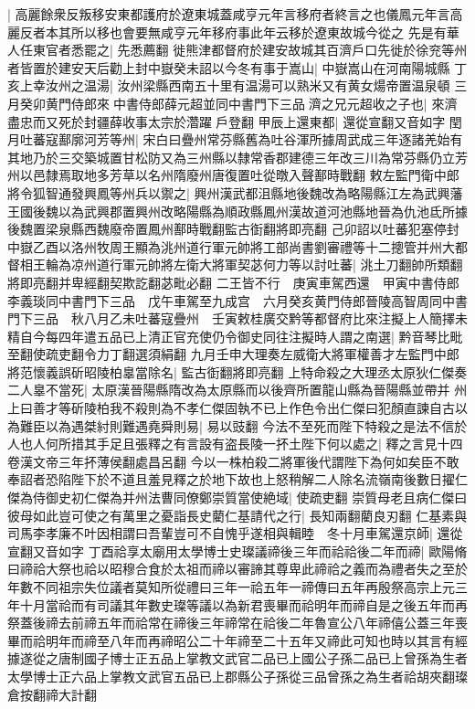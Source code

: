 |{
	高麗餘衆反叛移安東都護府於遼東城蓋咸亨元年言移府者終言之也儀鳳元年言高麗反者本其所以移也會要無咸亨元年移府事此年云移於遼東故城今從之}
先是有華人任東官者悉罷之|{
	先悉薦翻}
徙熊津都督府於建安故城其百濟戶口先徙於徐兖等州者皆置於建安天后勸上封中嶽癸未詔以今冬有事于嵩山|{
	中嶽嵩山在河南陽城縣}
丁亥上幸汝州之温湯|{
	汝州梁縣西南五十里有温湯可以熟米又有黄女煬帝置温泉頓}
三月癸卯黄門侍郎來中書侍郎薛元超並同中書門下三品濟之兄元超收之子也|{
	來濟盡忠而又死於封疆薛收事太宗於濳躍戶登翻}
甲辰上還東都|{
	還從宣翻又音如字}
閏月吐蕃寇鄯廓河芳等州|{
	宋白曰疊州常芬縣舊為吐谷渾所據周武成三年逐諸羌始有其地乃於三交築城置甘松防又為三州縣以隸常香郡建德三年改三川為常芬縣仍立芳州以邑隸焉取地多芳草以名州隋廢州唐復置吐從暾入聲鄯時戰翻}
敕左監門衛中郎將令狐智通發興鳳等州兵以禦之|{
	興州漢武都沮縣地後魏改為略陽縣江左為武興藩王國後魏以為武興郡置興州改略陽縣為順政縣鳳州漢故道河池縣地晉為仇池氐所據後魏置梁泉縣西魏廢帝置鳳州鄯時戰翻監古衘翻將即亮翻}
己卯詔以吐蕃犯塞停封中嶽乙酉以洛州牧周王顯為洮州道行軍元帥將工部尚書劉審禮等十二摠管并州大都督相王輪為凉州道行軍元帥將左衛大將軍契苾何力等以討吐蕃|{
	洮土刀翻帥所類翻將即亮翻并卑經翻契欺訖翻苾毗必翻}
二王皆不行　庚寅車駕西還　甲寅中書侍郎李義琰同中書門下三品　戊午車駕至九成宫　六月癸亥黄門侍郎晉陵高智周同中書門下三品　秋八月乙未吐蕃寇疊州　壬寅敕桂廣交黔等都督府比來注擬上人簡擇未精自今每四年遣五品已上清正官充使仍令御史同往注擬時人謂之南選|{
	黔音琴比毗至翻使疏吏翻令力丁翻選須絹翻}
九月壬申大理奏左威衛大將軍權善才左監門中郎將范懷義誤斫昭陵柏辠當除名|{
	監古衘翻將即亮翻}
上特命殺之大理丞太原狄仁傑奏二人辠不當死|{
	太原漢晉陽縣隋改為太原縣而以後齊所置龍山縣為晉陽縣並帶并}
州上曰善才等斫陵柏我不殺則為不孝仁傑固執不已上作色令出仁傑曰犯顏直諫自古以為難臣以為遇桀紂則難遇堯舜則易|{
	易以豉翻}
今法不至死而陛下特殺之是法不信於人也人何所措其手足且張釋之有言設有盗長陵一抔土陛下何以處之|{
	釋之言見十四卷漢文帝三年抔薄侯翻處昌呂翻}
今以一株柏殺二將軍後代謂陛下為何如矣臣不敢奉詔者恐陷陛下於不道且羞見釋之於地下故也上怒稍解二人除名流嶺南後數日擢仁傑為侍御史初仁傑為并州法曹同僚鄭崇質當使絶域|{
	使疏吏翻}
崇質母老且病仁傑曰彼母如此豈可使之有萬里之憂詣長史藺仁基請代之行|{
	長知兩翻藺良刃翻}
仁基素與司馬李孝廉不叶因相謂曰吾輩豈可不自愧乎遂相與輯睦　冬十月車駕還京師|{
	還從宣翻又音如字}
丁酉祫享太廟用太學博士史璨議禘後三年而祫祫後二年而禘|{
	歐陽脩曰禘祫大祭也祫以昭穆合食於太祖而禘以審諦其尊卑此禘祫之義而為禮者失之至於年數不同祖宗失位議者莫知所從禮曰三年一祫五年一禘傳曰五年再殷祭高宗上元三年十月當祫而有司議其年數史璨等議以為新君喪畢而祫明年而禘自是之後五年而再祭蓋後禘去前禘五年而祫常在禘後三年禘常在祫後二年魯宣公八年禘僖公蓋三年喪畢而祫明年而禘至八年而再禘昭公二十年禘至二十五年又禘此可知也時以其言有經據遂從之唐制國子博士正五品上掌教文武官二品已上國公子孫二品已上曾孫為生者太學博士正六品上掌教文武官五品已上郡縣公子孫從三品曾孫之為生者祫胡夾翻璨倉按翻禘大計翻}
